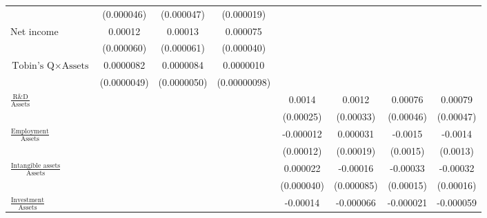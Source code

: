 {\begin{tabular}{l*{7}{c}}
                    &  (0.000046)         &  (0.000047)         &  (0.000019)         &                     &                     &                     &                     \\
\addlinespace
Net income          &     0.00012\sym{*}  &     0.00013\sym{**} &    0.000075\sym{*}  &                     &                     &                     &                     \\
                    &  (0.000060)         &  (0.000061)         &  (0.000040)         &                     &                     &                     &                     \\
\addlinespace
$\textrm{Tobin's Q} \times \textrm{Assets}$&   0.0000082\sym{*}  &   0.0000084\sym{*}  &   0.0000010         &                     &                     &                     &                     \\
                    & (0.0000049)         & (0.0000050)         &(0.00000098)         &                     &                     &                     &                     \\
\addlinespace
$\frac{\textrm{R\&D}}{\textrm{Assets}}$&                     &                     &                     &      0.0014\sym{***}&      0.0012\sym{***}&     0.00076\sym{*}  &     0.00079\sym{*}  \\
                    &                     &                     &                     &   (0.00025)         &   (0.00033)         &   (0.00046)         &   (0.00047)         \\
\addlinespace
$\frac{\textrm{Employment}}{\textrm{Assets}}$&                     &                     &                     &   -0.000012         &    0.000031         &     -0.0015         &     -0.0014         \\
                    &                     &                     &                     &   (0.00012)         &   (0.00019)         &    (0.0015)         &    (0.0013)         \\
\addlinespace
$\frac{\textrm{Intangible assets}}{\textrm{Assets}}$&                     &                     &                     &    0.000022         &    -0.00016\sym{*}  &    -0.00033\sym{**} &    -0.00032\sym{*}  \\
                    &                     &                     &                     &  (0.000040)         &  (0.000085)         &   (0.00015)         &   (0.00016)         \\
\addlinespace
$\frac{\textrm{Investment}}{\textrm{Assets}}$&                     &                     &                     &    -0.00014\sym{**} &   -0.000066         &   -0.000021         &   -0.000059         \\

\end{tabular}}
